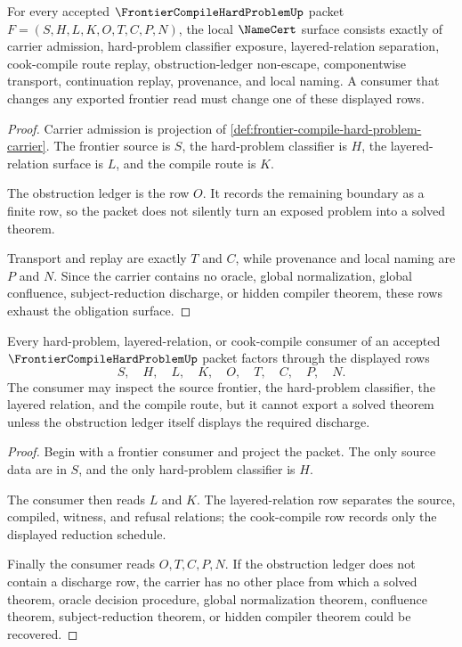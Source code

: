 \begin{theorem}
\label{thm:frontier-compile-hard-problem-namecert-obligations}
For every accepted $\FrontierCompileHardProblemUp$ packet $F=(S,H,L,K,O,T,C,P,N)$, the local $\NameCert$ surface consists exactly of carrier admission, hard-problem classifier exposure, layered-relation separation, cook-compile route replay, obstruction-ledger non-escape, componentwise transport, continuation replay, provenance, and local naming. A consumer that changes any exported frontier read must change one of these displayed rows.
\end{theorem}
\begin{proof}
Carrier admission is projection of \autoref{def:frontier-compile-hard-problem-carrier}. The frontier source is $S$, the hard-problem classifier is $H$, the layered-relation surface is $L$, and the compile route is $K$.

The obstruction ledger is the row $O$. It records the remaining boundary as a finite row, so the packet does not silently turn an exposed problem into a solved theorem.

Transport and replay are exactly $T$ and $C$, while provenance and local naming are $P$ and $N$. Since the carrier contains no oracle, global normalization, global confluence, subject-reduction discharge, or hidden compiler theorem, these rows exhaust the obligation surface.
\end{proof}

\begin{theorem}
\label{thm:frontier-compile-hard-problem-consumer-boundary}
Every hard-problem, layered-relation, or cook-compile consumer of an accepted $\FrontierCompileHardProblemUp$ packet factors through the displayed rows
$$
S,\quad H,\quad L,\quad K,\quad O,\quad T,\quad C,\quad P,\quad N .
$$
The consumer may inspect the source frontier, the hard-problem classifier, the layered relation, and the compile route, but it cannot export a solved theorem unless the obstruction ledger itself displays the required discharge.
\end{theorem}
\begin{proof}
Begin with a frontier consumer and project the packet. The only source data are in $S$, and the only hard-problem classifier is $H$.

The consumer then reads $L$ and $K$. The layered-relation row separates the source, compiled, witness, and refusal relations; the cook-compile row records only the displayed reduction schedule.

Finally the consumer reads $O,T,C,P,N$. If the obstruction ledger does not contain a discharge row, the carrier has no other place from which a solved theorem, oracle decision procedure, global normalization theorem, confluence theorem, subject-reduction theorem, or hidden compiler theorem could be recovered.
\end{proof}


